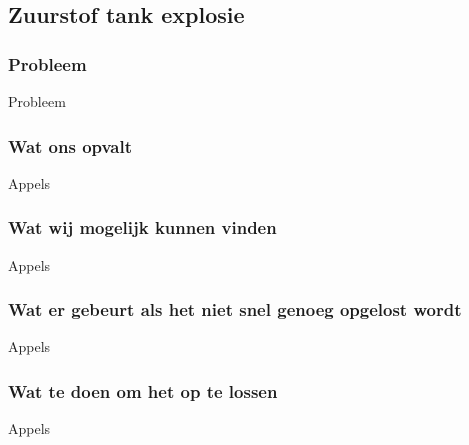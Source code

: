 \subsection{Zuurstof tank explosie}

\subsubsection{Probleem}
Probleem

\subsubsection{Wat ons opvalt}
Appels

\subsubsection{Wat wij mogelijk kunnen vinden}
Appels

\subsubsection{Wat er gebeurt als het niet snel genoeg opgelost wordt}
Appels

\subsubsection{Wat te doen om het op te lossen}
Appels